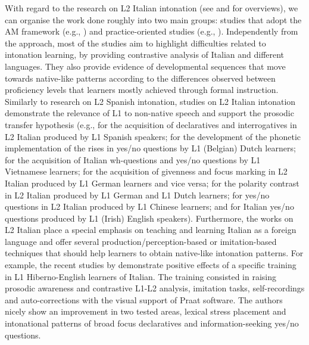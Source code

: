 With regard to the research on L2 Italian intonation (see  \citealt{DevísHerraiz2008, DeMeoPettorino2012} and \citealt{Nicora2020} for overviews), we can organise the work done roughly into two main groups: studies that adopt the AM framework (e.g., \citealt{AvesaniEtAl2015, TurcoEtAl2015, NicoraEtAl2019}) and practice-oriented studies (e.g., \citealt{PettorinoEtAl2012, DeMarcoEtAl2014, Mocciaro2014, ViglianoEtAl2016}). Independently from the approach, most of the studies aim to highlight difficulties related to intonation learning, by providing contrastive analysis of Italian and different languages. They also provide evidence of developmental sequences that move towards native-like patterns according to the differences observed between proficiency levels that learners mostly achieved through formal instruction. Similarly to research on L2 Spanish intonation, studies on L2 Italian intonation demonstrate the relevance of L1 to non-native speech and support the prosodic transfer hypothesis (e.g.,  \citealt{DevísHerraiz2008,DevísHerraiz2011} for the acquisition of declaratives and interrogatives in L2 Italian produced by L1 Spanish speakers; \citealt{CroccoBaele2012} for the development of the phonetic implementation of the rises in yes/no questions by L1 (Belgian) Dutch learners; \citealt{Mocciaro2014} for the acquisition of Italian wh-questions and yes/no questions by L1 Vietnamese learners; \citealt{AvesaniEtAl2015} for the acquisition of givenness and focus marking in L2 Italian produced by L1 German learners and vice versa; \citealt{TurcoEtAl2015} for the polarity contrast in L2 Italian produced by L1 German and L1 Dutch learners; \citealt{VitaleEtAl2017} for yes/no questions in L2 Italian produced by L1 Chinese learners; and \citealt{NicoraEtAl2018} for Italian yes/no questions produced by L1 (Irish) English speakers). Furthermore, the works on L2 Italian place a special emphasis on teaching and learning Italian as a foreign language and offer several production/perception-based or imitation-based techniques that should help learners to obtain native-like intonation patterns. For example, the recent studies by \citet{NicoraEtAl2018, NicoraEtAl2019} demonstrate positive effects of a specific training in L1 Hiberno-English learners of Italian. The training consisted in raising prosodic awareness and contrastive L1-L2 analysis, imitation tasks, self-recordings and auto-corrections with the visual support of Praat software. The authors nicely show an improvement in two tested areas, lexical stress placement and intonational patterns of broad focus declaratives and information-seeking yes/no questions.



